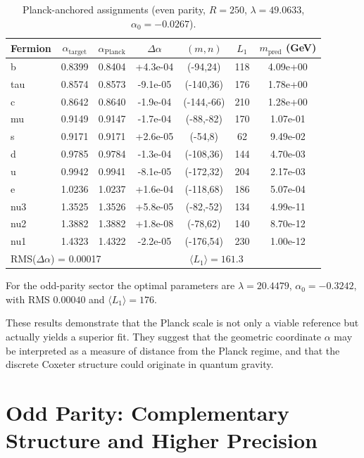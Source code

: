 \documentclass[11pt,a4paper]{article}
\begin{document}
\begin{table}[h!]
\centering
\caption{Planck-anchored assignments (even parity, $R=250$, $\lambda=49.0633$, $\alpha_0=-0.0267$).}
\label{tab:planck}
\small
\begin{tabular}{lcccccc}
\toprule
Fermion & $\alpha_{\text{target}}$ & $\alpha_{\text{Planck}}$ & $\Delta\alpha$ & $(m,n)$ & $L_1$ & $m_{\text{pred}}$ (GeV) \\
\midrule
b & 0.8399 & 0.8404 & +4.3e-04 & (-94,24) & 118 & 4.09e+00 \\
tau & 0.8574 & 0.8573 & -9.1e-05 & (-140,36) & 176 & 1.78e+00 \\
c & 0.8642 & 0.8640 & -1.9e-04 & (-144,-66) & 210 & 1.28e+00 \\
mu & 0.9149 & 0.9147 & -1.7e-04 & (-88,-82) & 170 & 1.07e-01 \\
s & 0.9171 & 0.9171 & +2.6e-05 & (-54,8) & 62 & 9.49e-02 \\
d & 0.9785 & 0.9784 & -1.3e-04 & (-108,36) & 144 & 4.70e-03 \\
u & 0.9942 & 0.9941 & -8.1e-05 & (-172,32) & 204 & 2.17e-03 \\
e & 1.0236 & 1.0237 & +1.6e-04 & (-118,68) & 186 & 5.07e-04 \\
nu3 & 1.3525 & 1.3526 & +5.8e-05 & (-82,-52) & 134 & 4.99e-11 \\
nu2 & 1.3882 & 1.3882 & +1.8e-08 & (-78,62) & 140 & 8.70e-12 \\
nu1 & 1.4323 & 1.4322 & -2.2e-05 & (-176,54) & 230 & 1.00e-12 \\
\midrule
\multicolumn{4}{l}{RMS($\Delta\alpha$) = 0.00017} & \multicolumn{2}{c}{$\langle L_1\rangle = 161.3$} \\
\bottomrule
\end{tabular}
\end{table}

For the odd-parity sector the optimal parameters are $\lambda = 20.4479$, $\alpha_0 = -0.3242$, with RMS $0.00040$ and $\langle L_1\rangle = 176$.

These results demonstrate that the Planck scale is not only a viable reference but actually yields a superior fit. They suggest that the geometric coordinate $\alpha$ may be interpreted as a measure of distance from the Planck regime, and that the discrete Coxeter structure could originate in quantum gravity.

\section{Odd Parity: Complementary Structure and Higher Precision}
\label{sec:odd}
\end{document}
